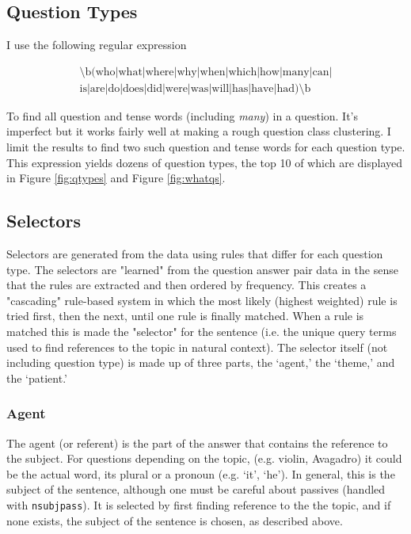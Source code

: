 \documentclass[twoside]{article}
\begin{document}
\subsection{Question Types}

I use the following regular expression

\begin{equation} \label{eq:qre}
\begin{split}
\text{\textbackslash b(who|what|where|why|when|which|how|many|can|}\\
\text{is|are|do|does|did|were|was|will|has|have|had)\textbackslash b}
\end{split}
\end{equation}

To find all question and tense words (including \textit{many}) in a question.  It's imperfect but it works fairly well at making a rough question class clustering.  I limit the results to find two such question and tense words for each question type.  This expression yields dozens of question types, the top 10 of which are displayed in Figure \ref{fig:qtypes} and Figure \ref{fig:whatqs}.

\subsection{Selectors}

Selectors are generated from the data using rules that differ for each question type.  The selectors are "learned" from the question answer pair data in the sense that the rules are extracted and then ordered by frequency.  This creates a "cascading" rule-based system in which the most likely (highest weighted) rule is tried first, then the next, until one rule is finally matched.  When a rule is matched this is made the "selector" for the sentence (i.e. the unique query terms used to find references to the topic in natural context).  The selector itself (not including question type) is made up of three parts, the `agent,' the `theme,' and the `patient.'

\subsubsection{Agent}

The agent (or referent) is the part of the answer that contains the reference to the subject.  For questions depending on the topic, (e.g. violin, Avagadro) it could be the actual word, its plural or a pronoun (e.g. `it', `he').  In general, this is the subject of the sentence, although one must be careful about passives (handled with \texttt{nsubjpass}).  It is selected by first finding reference to the the topic, and if none exists, the subject of the sentence is chosen, as described above.
\end{document}
